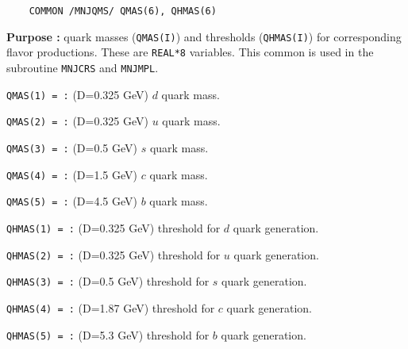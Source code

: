 %
%

\newlength{\MNJQMS}
\settowidth{\MNJQMS}{\tt   COMMON /MNJQMS/ QMAS(6), QHMAS(6)}
\begin{verbatim}
    COMMON /MNJQMS/ QMAS(6), QHMAS(6)
\end{verbatim}
\vspace{-28pt}
\hspace*{4ex}\fbox{\rule[14pt]{\MNJQMS}{0cm}}
\begin{list}{ }{\parsep=0pt \itemsep=0pt \topsep=0pt }
\item[\bf Purpose :] quark masses ({\tt QMAS(I)}) and 
thresholds ({\tt QHMAS(I)}) for corresponding flavor productions.
These are {\tt REAL*8} variables.  This common is used in
the subroutine {\tt MNJCRS} and {\tt MNJMPL}.
\item[\tt QMAS(1) = :] (D=0.325 GeV) $d$ quark mass.
\item[\tt QMAS(2) = :] (D=0.325 GeV) $u$ quark mass.
\item[\tt QMAS(3) = :] (D=0.5 GeV) $s$ quark mass.
\item[\tt QMAS(4) = :] (D=1.5 GeV) $c$ quark mass.
\item[\tt QMAS(5) = :] (D=4.5 GeV) $b$ quark mass.
\item[\tt QHMAS(1) = :] (D=0.325 GeV) threshold for $d$ quark generation.
\item[\tt QHMAS(2) = :] (D=0.325 GeV) threshold for $u$ quark generation.
\item[\tt QHMAS(3) = :] (D=0.5 GeV) threshold for $s$ quark generation.
\item[\tt QHMAS(4) = :] (D=1.87 GeV) threshold for $c$ quark generation.
\item[\tt QHMAS(5) = :] (D=5.3 GeV) threshold for $b$ quark generation.
\end{list}


